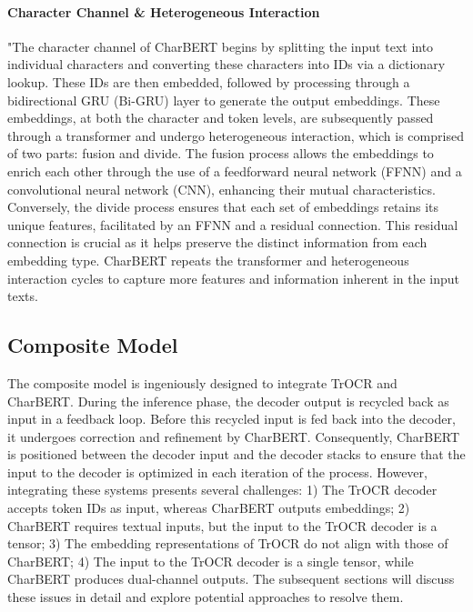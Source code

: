 \paragraph*{Character Channel \& Heterogeneous Interaction}
\label{par:3_character_channel_heterogeneous_interaction}
"The character channel of CharBERT begins by splitting the input text into individual characters and converting these characters into IDs via a dictionary lookup. These IDs are then embedded, followed by processing through a bidirectional GRU (Bi-GRU) layer to generate the output embeddings. These embeddings, at both the character and token levels, are subsequently passed through a transformer and undergo heterogeneous interaction, which is comprised of two parts: fusion and divide. The fusion process allows the embeddings to enrich each other through the use of a feedforward neural network (FFNN) and a convolutional neural network (CNN), enhancing their mutual characteristics. Conversely, the divide process ensures that each set of embeddings retains its unique features, facilitated by an FFNN and a residual connection. This residual connection is crucial as it helps preserve the distinct information from each embedding type. CharBERT repeats the transformer and heterogeneous interaction cycles to capture more features and information inherent in the input texts.

\subsection{Composite Model}
\label{subsec:3_composite_model}
The composite model is ingeniously designed to integrate TrOCR and CharBERT. During the inference phase, the decoder output is recycled back as input in a feedback loop. Before this recycled input is fed back into the decoder, it undergoes correction and refinement by CharBERT. Consequently, CharBERT is positioned between the decoder input and the decoder stacks to ensure that the input to the decoder is optimized in each iteration of the process. However, integrating these systems presents several challenges: 1) The TrOCR decoder accepts token IDs as input, whereas CharBERT outputs embeddings; 2) CharBERT requires textual inputs, but the input to the TrOCR decoder is a tensor; 3) The embedding representations of TrOCR do not align with those of CharBERT; 4) The input to the TrOCR decoder is a single tensor, while CharBERT produces dual-channel outputs. The subsequent sections will discuss these issues in detail and explore potential approaches to resolve them.

